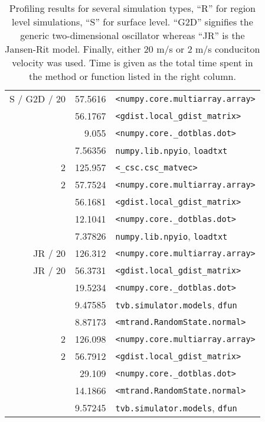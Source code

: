 \begin{table}
{\begin{tabular}{r | r | l }
S / G2D / 20 &         57.5616 & \texttt{<numpy.core.multiarray.array>} \\
 &         56.1767 & \texttt{<gdist.local\_gdist\_matrix>} \\
 &           9.055 & \texttt{<numpy.core.\_dotblas.dot>} \\
 &         7.56356 & \texttt{numpy.lib.npyio}, \texttt{loadtxt} \\
\hline
2 &         125.957 & \texttt{<\_csc.csc\_matvec>} \\
2 &         57.7524 & \texttt{<numpy.core.multiarray.array>} \\
 &         56.1681 & \texttt{<gdist.local\_gdist\_matrix>} \\
 &         12.1041 & \texttt{<numpy.core.\_dotblas.dot>} \\
 &         7.37826 & \texttt{numpy.lib.npyio}, \texttt{loadtxt} \\
\hline
JR / 20 &         126.312 & \texttt{<numpy.core.multiarray.array>} \\
JR / 20 &         56.3731 & \texttt{<gdist.local\_gdist\_matrix>} \\
 &         19.5234 & \texttt{<numpy.core.\_dotblas.dot>} \\
 &         9.47585 & \texttt{tvb.simulator.models}, \texttt{dfun} \\
 &         8.87173 & \texttt{<mtrand.RandomState.normal>} \\
\hline
2 &         126.098 & \texttt{<numpy.core.multiarray.array>} \\
2 &         56.7912 & \texttt{<gdist.local\_gdist\_matrix>} \\
 &          29.109 & \texttt{<numpy.core.\_dotblas.dot>} \\
 &         14.1866 & \texttt{<mtrand.RandomState.normal>} \\
 &         9.57245 & \texttt{tvb.simulator.models}, \texttt{dfun} \\
\hline

\end{tabular}}
\caption{Profiling results for several simulation types, ``R'' for region 
level simulations, ``S'' for surface level. ``G2D'' signifies the generic
two-dimensional oscillator whereas ``JR'' is the Jansen-Rit model. Finally,
either 20 m/s or 2 m/s conduciton velocity was used. Time is given as the
total time spent in the method or function listed in the right column.}
\label{tab:profiling}
\end{table}

